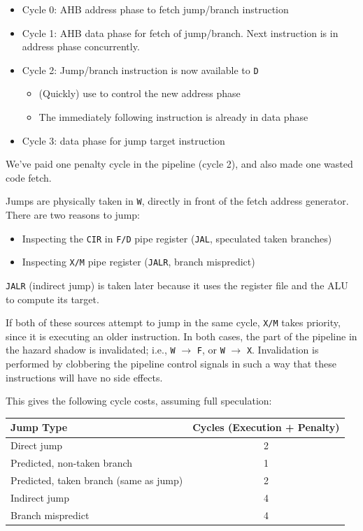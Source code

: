 \documentclass{article}
\begin{document}
\begin{itemize}
\item Cycle 0: AHB address phase to fetch jump/branch instruction
\item Cycle 1: AHB data phase for fetch of jump/branch. Next instruction is in address phase concurrently.
\item Cycle 2: Jump/branch instruction is now available to \texttt{D}
	\begin{itemize}
		\item (Quickly) use to control the new address phase
		\item The immediately following instruction is already in data phase
	\end{itemize}
\item Cycle 3: data phase for jump target instruction
\end{itemize}


We've paid one penalty cycle in the pipeline (cycle 2), and also made one wasted code fetch.

Jumps are physically taken in \texttt{W}, directly in front of the fetch address generator. There are two reasons to jump:

\begin{itemize}
	\item Inspecting the \texttt{CIR} in \texttt{F/D} pipe register (\texttt{JAL}, speculated taken branches)
	\item Inspecting \texttt{X/M} pipe register (\texttt{JALR}, branch mispredict)
\end{itemize}

\texttt{JALR} (indirect jump) is taken later because it uses the register file and the ALU to compute its target.

If both of these sources attempt to jump in the same cycle, \texttt{X/M} takes priority, since it is executing an older instruction. In both cases, the part of the pipeline in the hazard shadow is invalidated; i.e., \texttt{W} $\to$ \texttt{F}, or \texttt{W} $\to$ \texttt{X}. Invalidation is performed by clobbering the pipeline control signals in such a way that these instructions will have no side effects.

This gives the following cycle costs, assuming full speculation:

\begin{center}
\begin{tabular}{l c}
\hline
Jump Type & Cycles (Execution + Penalty) \\
\hline
Direct jump & 2 \\
Predicted, non-taken branch & 1 \\
Predicted, taken branch (same as jump) & 2 \\
Indirect jump & 4 \\
Branch mispredict & 4 \\
\hline
\end{tabular}
\end{center}
\end{document}
